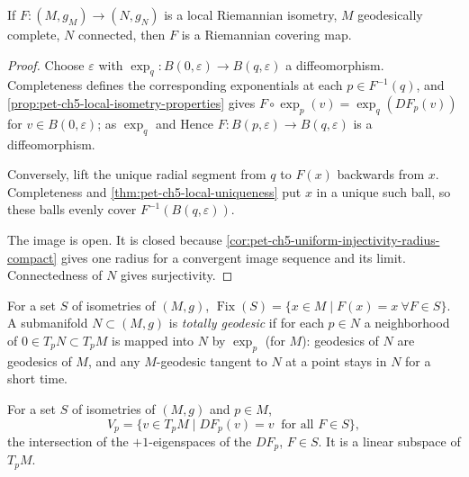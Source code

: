 \begin{lemma}
  \label{lem:pet-ch5-local-isometry-covering}
  If $F:(M,g_M)\to(N,g_N)$ is a local Riemannian isometry, $M$ geodesically
  complete, $N$ connected, then $F$ is a Riemannian covering map.
\end{lemma}
\begin{proof}
  \sketch
  Choose $\varepsilon$ with $\exp_q:B(0,\varepsilon)\to B(q,\varepsilon)$ a
  diffeomorphism. Completeness defines the corresponding exponentials at each
  $p\in F^{-1}(q)$, and \cref{prop:pet-ch5-local-isometry-properties} gives
  $F\circ\exp_p(v)=\exp_q(DF_p(v))$ for $v\in B(0,\varepsilon)$; as $\exp_q$ and
  Hence $F:B(p,\varepsilon)\to B(q,\varepsilon)$ is a diffeomorphism.

  Conversely, lift the unique radial segment from $q$ to $F(x)$ backwards from
  $x$. Completeness and \cref{thm:pet-ch5-local-uniqueness} put $x$ in a unique
  such ball, so these balls evenly cover $F^{-1}(B(q,\varepsilon))$.

  The image is open.  It is closed because
  \cref{cor:pet-ch5-uniform-injectivity-radius-compact} gives one radius for a
  convergent image sequence and its limit. Connectedness of $N$ gives surjectivity.
\end{proof}

\begin{definition}
  \label{def:pet-ch5-fixed-point-set}
  \leanok
  For a set $S$ of isometries of $(M,g)$, $\operatorname{Fix}(S)=\{x\in M\mid
  F(x)=x\ \forall F\in S\}$. A submanifold $N\subset(M,g)$ is \emph{totally
  geodesic} if for each $p\in N$ a neighborhood of $0\in T_pN\subset T_pM$ is
  mapped into $N$ by $\exp_p$ (for $M$): geodesics of $N$ are geodesics of $M$, and
  any $M$-geodesic tangent to $N$ at a point stays in $N$ for a short time.
\end{definition}

\begin{definition}
  \label{def:pet-ch5-fixed-tangent-subspace}
  \leanok
  For a set $S$ of isometries of $(M,g)$ and $p\in M$,
  \[
    V_p=\{v\in T_pM\mid DF_p(v)=v\ \text{ for all }F\in S\},
  \]
  the intersection of the $+1$-eigenspaces of the $DF_p$, $F\in S$. It is a linear
  subspace of $T_pM$.
\end{definition}

